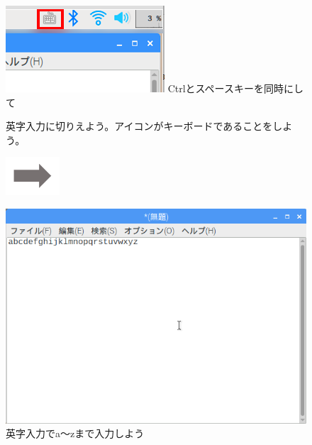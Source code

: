 \begin{figure}[ht]
  \begin{minipage}{0.4\textwidth}
    \includegraphics[width=\linewidth]{text01-img/textbook-img059.png}
     Ctrlとスペースキーを同時にして

    英字入力に切りえよう。アイコンがキーボードであることをしよう。
  \end{minipage}
  \includegraphics[width=2cm]{text01-img/textbook-img053.png}
  \begin{minipage}{0.4\textwidth}
    \includegraphics[width=\linewidth]{text01-img/textbook-img061.png}
     英字入力でa〜zまで入力しよう
  \end{minipage}


\end{figure}
